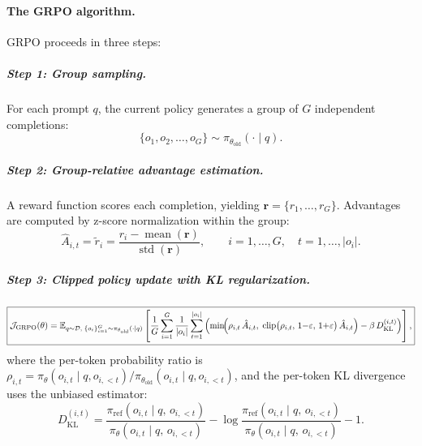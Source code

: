 \documentclass[12pt,a4paper]{report}
\theoremstyle{definition}
\begin{document}
\paragraph{The GRPO algorithm.}
GRPO proceeds in three steps:

\subparagraph{Step 1: Group sampling.}
For each prompt $q$, the current policy generates a group of $G$ independent completions:
\begin{equation}
\label{eq:grpo-sampling}
\{o_1, o_2, \ldots, o_G\} \sim \pi_{\theta_{\text{old}}}(\cdot \mid q).
\end{equation}

\subparagraph{Step 2: Group-relative advantage estimation.}
A reward function scores each completion, yielding $\mathbf{r} = \{r_1, \ldots, r_G\}$. Advantages are computed by z-score normalization within the group:
\begin{equation}
\label{eq:grpo-advantage}
\boxed{
\hat{A}_{i,t} = \tilde{r}_i
  = \frac{r_i - \operatorname{mean}(\mathbf{r})}
         {\operatorname{std}(\mathbf{r})},
\qquad i = 1, \ldots, G,
\quad t = 1, \ldots, |o_i|.}
\end{equation}

\subparagraph{Step 3: Clipped policy update with KL regularization.}
\begin{equation}
\label{eq:grpo-objective}
\boxed{
\mathcal{J}_{\text{GRPO}}(\theta)
  = \mathbb{E}_{q \sim \mathcal{D},\;
      \{o_i\}_{i=1}^{G} \sim \pi_{\theta_{\text{old}}}(\cdot|q)}
    \left[
      \frac{1}{G}\sum_{i=1}^{G}
      \frac{1}{|o_i|}\sum_{t=1}^{|o_i|}
      \left(
        \min\!\Bigl(
          \rho_{i,t}\,\hat{A}_{i,t},\;
          \operatorname{clip}\bigl(\rho_{i,t},\,
            1{-}\varepsilon,\,1{+}\varepsilon\bigr)\,\hat{A}_{i,t}
        \Bigr)
        - \beta\, D_{\mathrm{KL}}^{(i,t)}
      \right)
    \right],}
\end{equation}
where the per-token probability ratio is $\rho_{i,t} = \pi_\theta(o_{i,t} \mid q, o_{i,<t}) / \pi_{\theta_{\text{old}}}(o_{i,t} \mid q, o_{i,<t})$, and the per-token KL divergence uses the unbiased estimator:
\begin{equation}
\label{eq:grpo-kl}
D_{\mathrm{KL}}^{(i,t)}
  = \frac{\pi_{\text{ref}}(o_{i,t} \mid q,\, o_{i,<t})}
         {\pi_\theta(o_{i,t} \mid q,\, o_{i,<t})}
  - \log\frac{\pi_{\text{ref}}(o_{i,t} \mid q,\, o_{i,<t})}
             {\pi_\theta(o_{i,t} \mid q,\, o_{i,<t})}
  - 1.
\end{equation}
\end{document}
